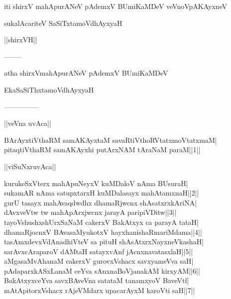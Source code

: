 \documentclass{article}
\begin{document}
\begin{center}
iti shirxV mahApurANeV pAdemxV BUmiKaMDeV veVnoVpAKAyxneV
\end{center}

\begin{center}
sukalAcariteV SaSiTxtamoVdhAyxyaH
\end{center}

\begin{center}
||shirxVH||
\end{center}

\begin{center}
--------
\end{center}

\begin{center}
atha shirxVmahApurANeV pAdemxV BUmiKaMDeV
\end{center}

\begin{center}
EkaSaSiThxtamoVdhAyxyaH
\end{center}

\begin{center}

---------------
\end{center}

\begin{center}
||veVna uvAca||
\end{center}

BArAyxtiVthaRM samAKAyxtaM savaRtiVthoRVtatxmoVtatxmaM|\\
pitaqtiVthaRM samAKAyxhi putArxNAM tAraNaM paraM||1||\\

\begin{center}
||viSuNxruvAca||
\end{center}

kurukeSxVterx mahApuNeyxV kuMDaloV nAma BUsuraH|\\
sukamAR nAma satupxtarxH kuMDalasayx mahAtamxnaH||2||\\
gurU tasayx mahAvaqdwdhx dhamaRjwcnx shAsatxrxkAriNA|\\
dAvxveVtw tw mahApArxjwcnx jarayA paripiVDitw||3||\\
tayoVshushxshUrxSaNaM cakerxV BakAtxyx ca parayA tataH|\\
dhamaRjocnxV BAvasaMyukotxV hayxhanishaRmariMdama||4||\\
tasAmxdevxVdAnadhiVteV sa pituH shAsAtxrxNayxneVkashaH|\\
sarAvxcAraparoV dAMtaH satayxvAnf jAcnxnavatasxlaH||5||\\
aMgasaMvAhanaM cakerxV gurovxVshacx savxyameVva saH|\\
pAdaparxkASxLanaM ceYva sAnxnaBoVjanakAM kirxyAM||6||\\
BakAtxyxceYva savxBAveVna satataM tanamxyoV BaveVtf|\\
mAtApitorxVshacx rAjeVMdarx upacarAyxM karoVti saH||7||\\
\end{document}
